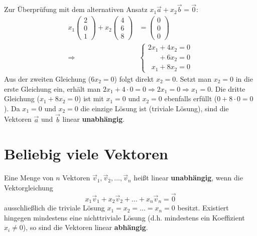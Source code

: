 Zur Überprüfung mit dem alternativen Ansatz $x_1 \vec{a} + x_2 \vec{b} =
    \vec{0}$:
\begin{align*}
    x_1 \begin{pmatrix} 2 \\ 0 \\ 1 \end{pmatrix} + x_2 \begin{pmatrix} 4 \\ 6 \\ 8 \end{pmatrix} & = \begin{pmatrix} 0 \\ 0 \\ 0 \end{pmatrix} \\
    \Rightarrow \quad                                                                             & \begin{cases}
                                                                                                        2x_1 + 4x_2 = 0           \\
                                                                                                        \phantom{0x_1} + 6x_2 = 0 \\
                                                                                                        \phantom{2}x_1 + 8x_2 = 0
                                                                                                    \end{cases}
\end{align*}
Aus der zweiten Gleichung ($6x_2 = 0$) folgt direkt $x_2 = 0$.
Setzt man $x_2 = 0$ in die erste Gleichung ein, erhält man $2x_1 + 4 \cdot 0 = 0 \Rightarrow 2x_1 = 0 \Rightarrow x_1 = 0$.
Die dritte Gleichung ($x_1 + 8x_2 = 0$) ist mit $x_1=0$ und $x_2=0$ ebenfalls erfüllt ($0 + 8 \cdot 0 = 0$).
Da $x_1=0$ und $x_2=0$ die einzige Lösung ist (triviale Lösung), sind die Vektoren $\vec{a}$ und $\vec{b}$ linear \textbf{unabhängig}.

\section{Beliebig viele Vektoren}

Eine Menge von $n$ Vektoren $\vec{v}_1, \vec{v}_2, \dots, \vec{v}_n$ heißt
linear \textbf{unabhängig}, wenn die Vektorgleichung
\[
    x_1 \vec{v}_1 + x_2 \vec{v}_2 + \dots + x_n \vec{v}_n = \vec{0}
\]
ausschließlich die triviale Lösung $x_1 = x_2 = \dots = x_n = 0$ besitzt.
Existiert hingegen mindestens eine nichttriviale Lösung (d.h. mindestens ein
Koeffizient $x_i \neq 0$), so sind die Vektoren linear \textbf{abhängig}.

